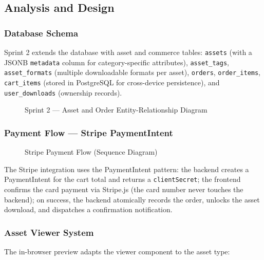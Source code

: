 \subsection{Analysis and Design}

\subsubsection{Database Schema}

Sprint 2 extends the database with asset and commerce tables: \texttt{assets} (with a JSONB \texttt{metadata} column for category-specific attributes), \texttt{asset\_tags}, \texttt{asset\_formats} (multiple downloadable formats per asset), \texttt{orders}, \texttt{order\_items}, \texttt{cart\_items} (stored in PostgreSQL for cross-device persistence), and \texttt{user\_downloads} (ownership records).

\begin{figure}[H]
\centering
\resizebox{\textwidth}{!}{}
\caption{Sprint 2 --- Asset and Order Entity-Relationship Diagram}
\label{fig:sprint2_erd}
\end{figure}

\subsubsection{Payment Flow --- Stripe PaymentIntent}

\begin{figure}[H]
\centering
\resizebox{\textwidth}{!}{}
\caption{Stripe Payment Flow (Sequence Diagram)}
\label{fig:sprint2_payment}
\end{figure}

The Stripe integration uses the PaymentIntent pattern: the backend creates a PaymentIntent for the cart total and returns a \texttt{clientSecret}; the frontend confirms the card payment via Stripe.js (the card number never touches the backend); on success, the backend atomically records the order, unlocks the asset download, and dispatches a confirmation notification.

\subsubsection{Asset Viewer System}

The in-browser preview adapts the viewer component to the asset type:

